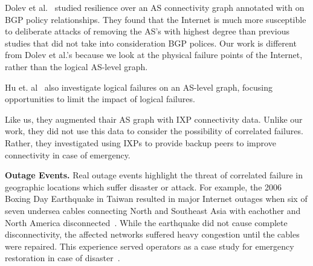     Dolev et al.~\cite{resilience-under-BGP} studied resilience over an AS
    connectivity graph annotated with on BGP policy relationships. They found
    that the Internet is much more susceptible to deliberate attacks of
    removing the AS's with highest degree than previous studies that did not
    take into consideration BGP polices. Our work is different from Dolev et
    al.'s because we look at the physical failure points of the Internet,
    rather than the logical AS-level graph.  
    
    Hu et. al~\cite{ixp-routingdiversity} also investigate logical failures on
    an AS-level graph, focusing opportunities to limit the impact of logical
    failures.

    Like us, they augmented thair AS graph with IXP connectivity data.  Unlike
    our work, they did not use this data to consider the possibility of
    correlated failures.  Rather, they investigated using IXPs to provide
    backup peers to improve connectivity in case of emergency.

{\bf Outage Events.}  Real outage events highlight the threat of correlated
    failure in geographic locations which suffer disaster or attack.  For
    example, the 2006 Boxing Day Earthquake in Taiwan resulted in major
    Internet outages when six of seven undersea cables connecting North and
    Southeast Asia with eachother and North America
    disconnected~\cite{asia-comm-quake}.  While the earthquake did not cause
    complete disconnectivity, the affected networks suffered heavy congestion
    until the cables were repaired.  This experience served operators as a case
    study for emergency restoration in case of disaster~\cite{taiwan}.
       


